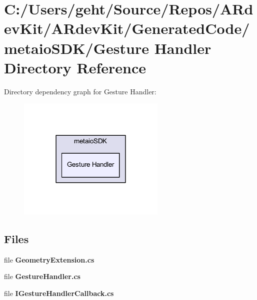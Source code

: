 \section{C\-:/\-Users/geht/\-Source/\-Repos/\-A\-Rdev\-Kit/\-A\-Rdev\-Kit/\-Generated\-Code/metaio\-S\-D\-K/\-Gesture Handler Directory Reference}
\label{dir_dd90b61eb2ffc2ab0e1cac955d0427f8}
Directory dependency graph for Gesture Handler\-:
\nopagebreak
\begin{figure}[H]
\begin{center}
\leavevmode
\includegraphics[width=200pt]{dir_dd90b61eb2ffc2ab0e1cac955d0427f8_dep}
\end{center}
\end{figure}
\subsection*{Files}
\begin{DoxyCompactItemize}
\item 
file {\bfseries Geometry\-Extension.\-cs}
\item 
file {\bfseries Gesture\-Handler.\-cs}
\item 
file {\bfseries I\-Gesture\-Handler\-Callback.\-cs}
\end{DoxyCompactItemize}

